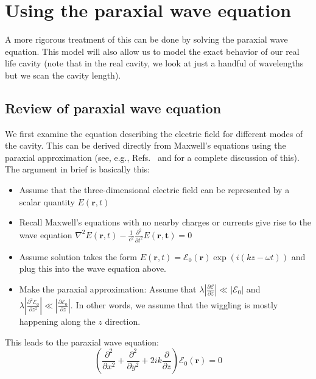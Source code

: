 \section{Using the paraxial wave equation}

A more rigorous treatment of this can be done by solving the paraxial wave equation. This model will also allow us to model the exact behavior of our real life cavity (note that in the real cavity, we look at just a handful of wavelengths but we scan the cavity length).

\subsection{Review of paraxial wave equation}

We first examine the equation describing the electric field for different modes of the cavity. This can be derived directly from Maxwell's equations using the paraxial approximation (see, e.g., Refs.\ \cite{lasersMilonniEberly} and \cite{bergeson_amo_notes} for a complete discussion of this). The argument in brief is basically this: 

\begin{itemize}
\item Assume that the three-dimensional electric field can be represented by a scalar quantity $E(\mathbf{r},t)$
\item Recall Maxwell's equations with no nearby charges or currents give rise to the wave equation $\nabla^2E(\mathbf{r},t)-\frac{1}{c^2} \frac{\partial^2}{\partial t^2} E(\mathbf{r,t})=0$
\item Assume solution takes the form $E(\mathbf{r},t) = \mathcal{E}_0(\mathbf{r}) \exp(i(kz-\omega t))$ and plug this into the wave equation above. 
\item Make the paraxial approximation: Assume that $\lambda \left|\frac{\partial \mathcal{E}}{\partial z} \right| \ll |\mathcal{E}_0|$ and $\lambda \left| \frac{\partial^2\mathcal{E}_0}{\partial z^2}\right| \ll \left| \frac{\partial \mathcal{E}_0}{\partial z}\right|$. In other words, we assume that the wiggling
is mostly happening along the $z$ direction. 
\end{itemize}

This leads to the paraxial wave equation: 
\begin{equation}
\left(\frac{\partial^2}{\partial x^2}+\frac{\partial^2}{\partial y^2}+2ik\frac{\partial}{\partial z}\right) \mathcal{E}_0(\mathbf{r})=0 \label{final_paraxial_wave_eqn}
\end{equation}

